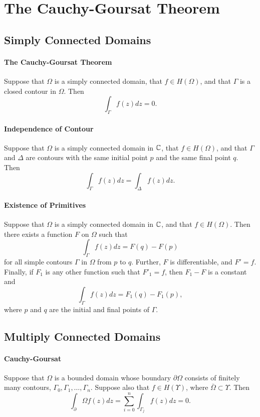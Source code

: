 \section{The Cauchy-Goursat Theorem}

\subsection{Simply Connected Domains}
\paragraph{The Cauchy-Goursat Theorem}
Suppose that \(\Omega\) is a simply connected domain, that \(f \in H(\Omega)\), and that \(\Gamma\) is a closed contour in \(\Omega\). Then
\[\int_\Gamma f(z) dz = 0.\]

\paragraph{Independence of Contour}
Suppose that \(\Omega\) is a simply connected domain in \(\mathbb{C}\), that \(f \in H(\Omega)\), and that \(\Gamma\) and \(\Delta\) are contours with the same initial point \(p\) and the same final point \(q\). Then
\[\int_\Gamma f(z) dz = \int_\Delta f(z) dz.\]

\paragraph{Existence of Primitives}
Suppose that \(\Omega\) is a simply connected domain in \(\mathbb{C}\), and that \(f \in H(\Omega)\). Then there exists a function \(F\) on \(\Omega\) such that
\[\int_\Gamma f(z) dz = F(q) - F(p)\]
for all simple contours \(\Gamma\) in \(\Omega\) from \(p\) to \(q\). Further, \(F\) is differentiable, and \(F' = f\). Finally, if \(F_1\) is any other function such that \(F'_1 = f\), then \(F_1 - F\) is a constant and
\[\int_\Gamma f(z) dz = F_1(q) - F_1(p),\]
where \(p\) and \(q\) are the initial and final points of \(\Gamma\).

\subsection{Multiply Connected Domains}
\paragraph{Cauchy-Goursat}
Suppose that \(\Omega\) is a bounded domain whose boundary \(\partial\Omega\) consists of finitely many contours, \(\Gamma_0, \Gamma_1, \dots, \Gamma_n\). Suppose also that \(f \in H(\Upsilon)\), where \(\bar{\Omega} \subset \Upsilon\). Then
\[\int_\partial\Omega f(z) dz = \sum_{i=0}^n \int_{\Gamma_j} f(z) dz = 0.\]

